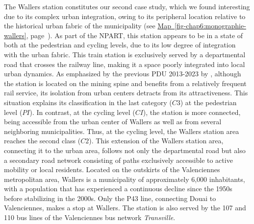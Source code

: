 \begin{refsegment}
The Wallers station constitutes our second case study, which we found interesting due to its complex urban integration, owing to its peripheral location relative to the historical urban fabric of the municipality (see \hyperref[fig-chap6:monographie-wallers]{Map~\ref{fig-chap6:monographie-wallers}}, page~\pageref{fig-chap6:monographie-wallers}). As part of the \acrshort{NPART}, this station appears to be in a state of  both at the pedestrian and cycling levels, due to its low degree of integration with the urban fabric. This train station is exclusively served by a departmental road that crosses the railway line, making it a space poorly integrated into local urban dynamics. As emphasized by the previous \acrfull{PDU} 2013-2023 by \textcolor{blue}{\textcite[78]{siturv_plan_2014}}, although the station is located on the mining spine and benefits from a relatively frequent rail service, its isolation from urban centers detracts from its attractiveness. This situation explains its classification in the last category (\(C3\)) at the pedestrian level (\(PI\)). In contrast, at the cycling level (\(CI\)), the station is more connected, being accessible from the urban center of Wallers as well as from several neighboring municipalities. Thus, at the cycling level, the Wallers station area reaches the second class (\(C2\)). This extension of the Wallers station area, connecting it to the urban area, follows not only the departmental road but also a secondary road network consisting of paths exclusively accessible to active mobility or local residents. Located on the outskirts of the Valenciennes metropolitan area, Wallers is a municipality of approximately 6,000 inhabitants, with a population that has experienced a continuous decline since the 1950s before stabilizing in the 2000s. Only the P43 line, connecting Douai to Valenciennes, makes a stop at Wallers. The station is also served by the 107 and 110 bus lines of the Valenciennes bus network \textsl{Transville}.%


\end{refsegment}
